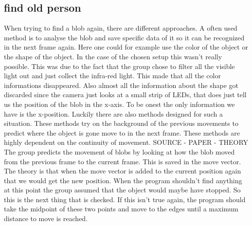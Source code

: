 \subsection{find old person}
When trying to find a blob again, there are different approaches. A often used method is to analyse the blob and save specific data of it so it can be recognized in the next frame again. Here one could for example use the color of the object or the shape of the object. In the case of the chosen setup this wasn't really possible. This was due to the fact that the group chose to filter all the visible light out and just collect the infra-red light. This made that all the color informations disappeared. Also almost all the information about the shape got discarded since the camera just looks at a small strip of LEDs, that does just tell us the position of the blob in the x-axis. To be onest the only information we have is the x-position. Luckily there are also methods designed for such a situation. These methods try on the background of the previous movements to predict where the object is gone move to in the next frame.
These methods are highly dependent on the continuity of movement. SOURCE - PAPER - THEORY
The group predicts the movement of blobs by looking at how the blob moved from the previous frame to the current frame. This is saved in the move vector. The theory is that when the move vector is added to the current position again that we would get the new position. 
When the program shouldn't find anything at this point the group assumed that the object would maybe have stopped. So this is the next thing that is checked. If this isn't true again, the program should take the midpoint of these two points and move to the edges until a maximum distance to move is reached. 

